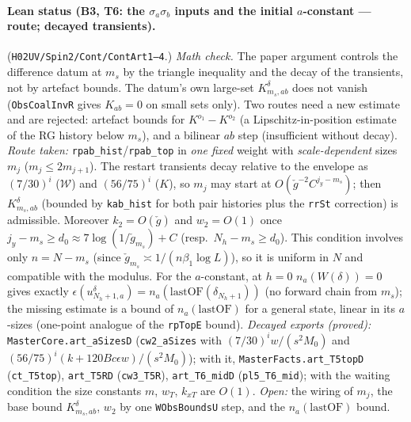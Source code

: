 \documentclass[11pt]{amsart}
\theoremstyle{definition}
\theoremstyle{remark}
\numberwithin{equation}{section}
\begin{document}
\paragraph{Lean status (B3, T6: the $\sigma_a\sigma_b$ inputs and the initial $a$-constant --- route; decayed transients).}
(\texttt{H02UV/Spin2/Cont/ContArt1--4}.) \emph{Math check.} The paper argument controls the difference datum at $m_s$ by the triangle
inequality and the decay of the transients, not by artefact bounds. The datum's own large-set $K^\delta_{m_s,ab}$ does not
vanish (\texttt{ObsCoalInvR} gives $K_{ab}=0$ on small sets only). Two routes need a new estimate and are rejected:
artefact bounds for $K^{o_1}-K^{o_2}$ (a Lipschitz-in-position estimate of the RG history below $m_s$), and a bilinear
$ab$ step (insufficient without decay). \emph{Route taken:} \texttt{rpab\_hist}/\texttt{rpab\_top} in \emph{one fixed}
weight with \emph{scale-dependent} sizes $m_j$ ($m_j\le2m_{j+1}$). The restart transients decay relative to the envelope as
$(7/30)^i$ ($\mathcal W$) and $(56/75)^i$ ($K$), so $m_j$ may start at $O(\check g^{-2}C^{j_y-m_s})$; then $K^\delta_{m_s,ab}$
(bounded by \texttt{kab\_hist} for both pair histories plus the \texttt{rrSt} correction) is admissible. Moreover
$k_2=O(\check g)$ and $w_2=O(1)$ once $j_y-m_s\ge d_0\approx7\log(1/\check g_{m_s})+C$ (resp.\ $N_h-m_s\ge d_0$). This
condition involves only $n=N-m_s$ (since $\check g_{m_s}\asymp1/(n\beta_1\log L)$), so it is uniform in $N$ and compatible
with the modulus. For the $a$-constant, at $h=0$ $n_a(W(\delta))=0$ gives exactly
$\epsilon(u^\delta_{N_h+1,a})=n_a(\mathrm{lastOF}(\delta_{N_h+1}))$ (no forward chain from $m_s$); the missing estimate is a
bound of $n_a(\mathrm{lastOF})$ for a general state, linear in its $a$-sizes (one-point analogue of the
\texttt{rpTopE} bound). \emph{Decayed exports (proved):} \texttt{MasterCore.art\_aSizesD} (\texttt{cw2\_aSizes} with
$(7/30)^i w/(s^2M_0)$ and $(56/75)^i(k+120B c\epsilon w)/(s^2M_0)$); with it, \texttt{MasterFacts.art\_T5topD}
(\texttt{ct\_T5top}), \texttt{art\_T5RD} (\texttt{cw3\_T5R}), \texttt{art\_T6\_midD} (\texttt{pl5\_T6\_mid}); with the waiting
condition the size constants $m$, $w_T$, $k_{xT}$ are $O(1)$. \emph{Open:} the wiring of $m_j$, the base bound
$K^\delta_{m_s,ab}$, $w_2$ by one \texttt{WObsBoundsU} step, and the $n_a(\mathrm{lastOF})$ bound.
\end{document}
